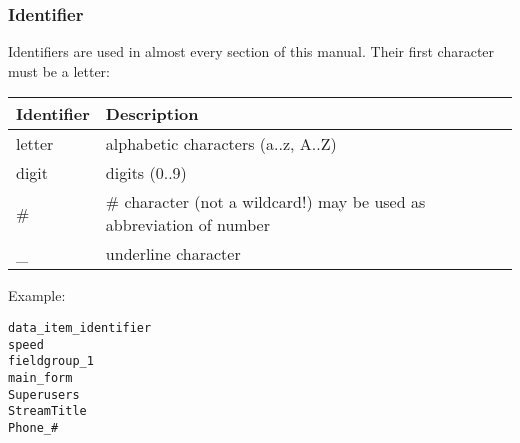 \newpage
\subsubsection{Identifier}
\label{sec:identifier}
Identifiers are used in almost every section of this manual.
Their first character must be a letter: \\



\begin{tabularx}{\textwidth}{l|X}
Identifier & Description \\
\hline
letter    & alphabetic characters  (a..z, A..Z) \\
digit     & digits (0..9) \\
\#        & \# character (not a wildcard!) may be used as abbreviation of number \\
\_        & underline character \\
\end{tabularx}





\label{sec:stringexamples}
\vspace{1cm}

Example:


\begin{boxedminipage}[t]{\linewidth}
\begin{verbatim}
data_item_identifier
speed
fieldgroup_1
main_form
Superusers
StreamTitle
Phone_#
\end{verbatim}
\end{boxedminipage}
